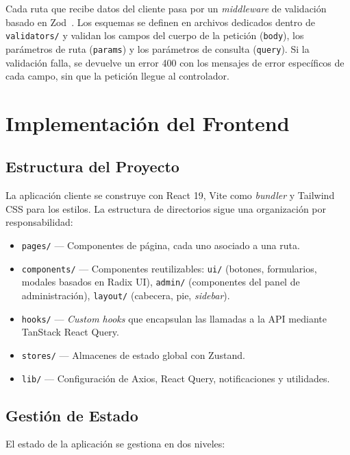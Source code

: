 Cada ruta que recibe datos del cliente pasa por un \textit{middleware} de validaci\'on basado en Zod~\cite{zod_docs}. Los esquemas se definen en archivos dedicados dentro de \texttt{validators/} y validan los campos del cuerpo de la petici\'on (\texttt{body}), los par\'ametros de ruta (\texttt{params}) y los par\'ametros de consulta (\texttt{query}). Si la validaci\'on falla, se devuelve un error 400 con los mensajes de error espec\'ificos de cada campo, sin que la petici\'on llegue al controlador.

\section{Implementaci\'on del Frontend}\label{sec:frontend}

\subsection{Estructura del Proyecto}\label{subsec:estructura-frontend}

La aplicaci\'on cliente se construye con React 19, Vite como \textit{bundler} y Tailwind CSS para los estilos. La estructura de directorios sigue una organizaci\'on por responsabilidad:

\begin{itemize}
    \item \texttt{pages/} --- Componentes de p\'agina, cada uno asociado a una ruta.
    \item \texttt{components/} --- Componentes reutilizables: \texttt{ui/} (botones, formularios, modales basados en Radix UI), \texttt{admin/} (componentes del panel de administraci\'on), \texttt{layout/} (cabecera, pie, \textit{sidebar}).
    \item \texttt{hooks/} --- \textit{Custom hooks} que encapsulan las llamadas a la API mediante TanStack React Query.
    \item \texttt{stores/} --- Almacenes de estado global con Zustand.
    \item \texttt{lib/} --- Configuraci\'on de Axios, React Query, notificaciones y utilidades.
\end{itemize}

\subsection{Gesti\'on de Estado}\label{subsec:estado}

El estado de la aplicaci\'on se gestiona en dos niveles:

